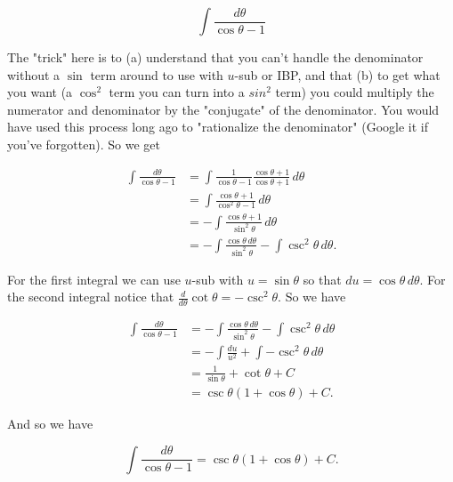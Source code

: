 \documentclass[12pt, letterpaper]{article}
\begin{document}
$$ \int \frac{d\theta}{\cos{\theta} - 1} $$

The "trick" here is to (a) understand that you can't handle the denominator without a $\sin$ term around to use with $u$-sub or IBP, and that (b) to get what you want (a $\cos^2$ term you can turn into a $sin^2$ term) you could multiply the numerator and denominator by the "conjugate" of the denominator. You would have used this process long ago to "rationalize the denominator" (Google it if you've forgotten). So we get

\begin{equation*}
\begin{aligned}
\int \frac{d\theta}{\cos{\theta} - 1}
  &= \int \frac{1}{\cos{\theta} - 1} \frac{\cos{\theta} + 1}{\cos{\theta} + 1} \, d\theta \\[0.2in]
  &= \int \frac{\cos{\theta} + 1}{\cos^2{\theta} - 1} \, d\theta \\[0.2in]
  &= -\int \frac{\cos{\theta} + 1}{\sin^2{\theta}} \, d\theta \\[0.2in]
  &= -\int \frac{\cos{\theta} \, d\theta}{\sin^2{\theta}} - \int \csc^2{\theta} \, d\theta.
\end{aligned}
\end{equation*}

For the first integral we can use $u$-sub with $u = \sin{\theta}$ so that $du = \cos{\theta} \, d\theta$. For the second integral notice that $\frac{d}{d\theta}\cot{\theta} = -\csc^2{\theta}$. So we have

\begin{equation*}
\begin{aligned}
\int \frac{d\theta}{\cos{\theta} - 1}
  &= -\int \frac{\cos{\theta} \, d\theta}{\sin^2{\theta}} - \int \csc^2{\theta} \, d\theta \\[0.2in]
  &= -\int \frac{du}{u^2} + \int -\csc^2{\theta} \, d\theta \\[0.2in]
  &= \frac{1}{\sin{\theta}} + \cot{\theta} + C \\[0.2in]
  &= \csc{\theta}\left( 1 + \cos{\theta} \right) + C.
\end{aligned}
\end{equation*}

And so we have

\begin{equation*}
\boxed
{
\int \frac{d\theta}{\cos{\theta} - 1}
  = \csc{\theta}\left( 1 + \cos{\theta} \right) + C.
}
\end{equation*}


\newpage
\end{document}
